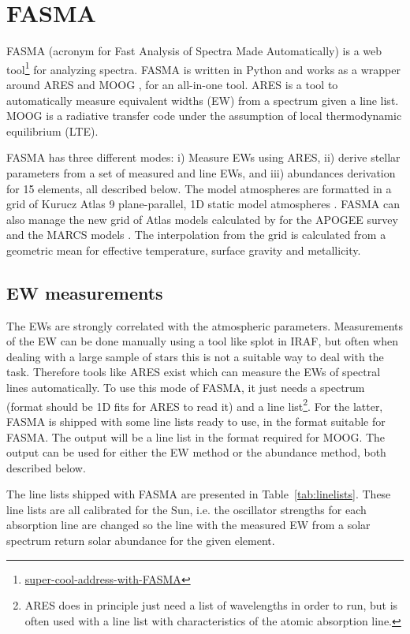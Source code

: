 \documentclass{aa}
\begin{document}
\section{FASMA}
\label{sec:FASMA}
FASMA (acronym for Fast Analysis of Spectra Made Automatically) is a web
tool\footnote{\url{super-cool-address-with-FASMA}} for analyzing spectra. FASMA
is written in Python and works as a wrapper around ARES \citep{Sousa2015a} and
MOOG \citep[][version 2014]{Sneden1973}, for an all-in-one tool. ARES is a tool
to automatically measure equivalent widths (EW) from a spectrum given a line
list. MOOG is a radiative transfer code under the assumption of local
thermodynamic equilibrium (LTE).

FASMA has three different modes: i) Measure EWs using ARES, ii) derive stellar
parameters from a set of measured  and  line EWs, and
iii) abundances derivation for 15 elements, all described below. The model
atmospheres are formatted in a grid of Kurucz Atlas 9 plane-parallel, 1D static
model atmospheres \citet{Kurucz1993}. FASMA can also manage the new grid of
Atlas models calculated by \citet{Meszaros2012} for the APOGEE survey and the
MARCS models \citep{Gustafson2008}. The interpolation from the grid is
calculated from a geometric mean for effective temperature, surface gravity and
metallicity.



\subsection{EW measurements}
\label{sub:EW_measurements}
The EWs are strongly correlated with the atmospheric parameters. Measurements of
the EW can be done manually using a tool like splot in IRAF, but often when
dealing with a large sample of stars this is not a suitable way to deal with the
task. Therefore tools like ARES exist which can measure the EWs of spectral
lines automatically. To use this mode of FASMA, it just needs a spectrum (format
should be 1D fits for ARES to read it) and a line list\footnote{ARES does in
principle just need a list of wavelengths in order to run, but is often used
with a line list with characteristics of the atomic absorption line.}. For the
latter, FASMA is shipped with some line lists ready to use, in the format
suitable for FASMA. The output will be a line list in the format required for
MOOG. The output can be used for either the EW method or the abundance method,
both described below.

The line lists shipped with FASMA are presented in Table~\ref{tab:linelists}.
These line lists are all calibrated for the Sun, i.e. the oscillator strengths
for each absorption line are changed so the line with the measured EW from a
solar spectrum return solar abundance for the given element.
\end{document}
